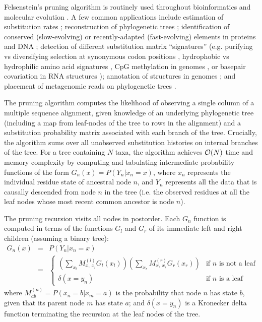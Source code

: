 \documentclass{article}
\begin{document}
Felsenstein's pruning algorithm is routinely used throughout bioinformatics and molecular evolution \cite{Felsenstein81}.
A few common applications include estimation of substitution rates \cite{Yang94b};
reconstruction of phylogenetic trees \cite{RannalaYang96};
identification of conserved (slow-evolving) or recently-adapted (fast-evolving) elements in proteins and DNA \cite{SiepelHaussler04b};
detection of different substitution matrix ``signatures''
(e.g. purifying vs diversifying selection at synonymous codon positions \cite{YangEtAl2000},
hydrophobic vs hydrophilic amino acid signatures \cite{ThorneEtAl96},
CpG methylation in genomes \cite{SiepelHaussler04},
or basepair covariation in RNA structures \cite{KnudsenHein99});
annotation of structures in genomes \cite{SiepelHaussler04c,PedersenEtAl2006};
and placement of metagenomic reads on phylogenetic trees \cite{MatsenEtAl2010}.

The pruning algorithm computes the likelihood of observing a single column of a multiple sequence alignment,
 given knowledge of an underlying phylogenetic tree (including a map from leaf-nodes of the tree to rows in the alignment)
 and a substitution probability matrix associated with each branch of the tree.
Crucially, the algorithm sums over all unobserved substitution histories on internal branches of the tree.
For a tree containing $N$ taxa, the algorithm achieves ${\cal O}(N)$ time and memory complexity by computing and tabulating intermediate probability functions of the form $G_n(x) = P(Y_n|x_n=x)$,
where $x_n$ represents the individual residue state of ancestral node $n$,
and $Y_n$ represents all the data that is causally descended from node $n$ in the tree (i.e. the observed residues at all the leaf nodes whose most recent common ancestor is node $n$).

The pruning recursion visits all nodes in postorder.
Each $G_n$ function is computed in terms of the functions $G_l$ and $G_r$ of its immediate left and right children (assuming a binary tree):
\begin{eqnarray*}
G_n(x) & = & P(Y_n|x_n = x) \\
& = & \left\{
\begin{array}{ll}
\left( \sum_{x_l} M^{(l)}_{x,\ x_l} G_l(x_l) \right) \left( \sum_{x_r} M^{(r)}_{x,\ x_r} G_r(x_r) \right) & \mbox{if $n$ is not a leaf}
 \\
\delta(x=y_n) & \mbox{if $n$ is a leaf}
\end{array}
\right.
\end{eqnarray*}
where $M^{(n)}_{ab} = P(x_n=b|x_m=a)$ is the probability that node $n$ has state $b$, given that its parent node $m$ has state $a$;
and $\delta(x=y_n)$ is a Kronecker delta function terminating the recursion at the leaf nodes of the tree.
\end{document}
